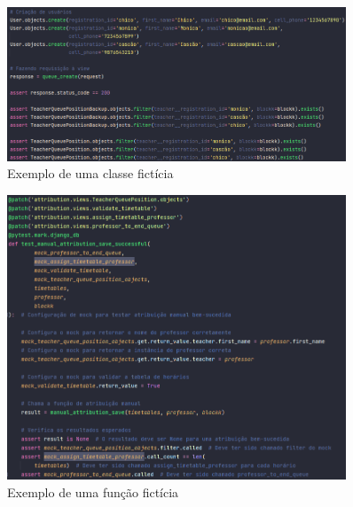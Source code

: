 \documentclass[12pt]{article}
\begin{document}
\begin{figure}[h]
    \centering
    \includegraphics[width=0.9\textwidth]{classeficticia.png}
    \caption{Exemplo de uma classe fictícia}
    \label{fig:classeficticia}
\end{figure}
\begin{figure}[h]
    \centering
    \includegraphics[width=0.9\textwidth]{funcaoficticia.png}
    \caption{Exemplo de uma função fictícia}
    \label{fig:funcaoficticia}
\end{figure}
\end{document}
